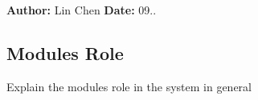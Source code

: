 {\bfseries Author\+:} Lin Chen {\bfseries Date\+:} 09.. \subsection*{Module\textquotesingle{}s Role}

Explain the module\textquotesingle{}s role in the system in general 